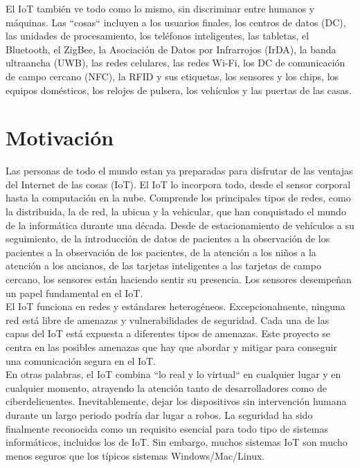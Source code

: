 {El IoT también ve todo como lo mismo, sin discriminar entre humanos y máquinas. Las ``cosas`` incluyen a los usuarios finales, los centros de datos (DC), las unidades de procesamiento, los teléfonos inteligentes, las tabletas, el Bluetooth, el ZigBee, la Asociación de Datos por Infrarrojos (IrDA), la banda ultraancha (UWB), las redes celulares, las redes Wi-Fi, los DC de comunicación de campo cercano (NFC), la RFID y sus etiquetas, los sensores y los chips, los equipos domésticos, los relojes de pulsera, los vehículos y las puertas de las casas. \cite{lea2020iot} \\

\section{Motivación} \label{motivacion}

Las personas de todo el mundo estan ya preparadas para disfrutar de las ventajas del Internet de las cosas (IoT). El IoT lo incorpora todo, desde el sensor corporal hasta la computación en la nube. Comprende los principales tipos de redes, como la distribuida, la de red, la ubicua y la vehicular, que han conquistado el mundo de la informática durante una década. Desde de estacionamiento de vehículos a su seguimiento, de la introducción de datos de pacientes a la observación de los pacientes a la observación de los pacientes, de la atención a los niños a la atención a los ancianos, de las tarjetas inteligentes a las tarjetas de campo cercano, los sensores están haciendo sentir su presencia. Los sensores desempeñan un papel fundamental en el IoT.\\

El IoT funciona en redes y estándares heterogéneos. Excepcionalmente, ninguna red está libre de amenazas y vulnerabilidades de seguridad. Cada una de las capas del IoT está expuesta a diferentes tipos de amenazas. Este proyecto se centra en las posibles amenazas que hay que abordar y mitigar para conseguir una comunicación segura en el IoT. \cite{hanes2017iot} \\

En otras palabras, el IoT combina ``lo real y lo virtual`` en cualquier lugar y en cualquier momento, atrayendo la atención tanto de desarrolladores como de ciberdelicuentes. Inevitablemente, dejar los dispositivos sin intervención humana durante un largo periodo podría dar lugar a robos. La seguridad ha sido finalmente reconocida como un requisito esencial para todo tipo de sistemas informáticos, incluidos los de IoT. Sin embargo, muchos sistemas IoT son mucho menos seguros que los típicos sistemas Windows/Mac/Linux. \\

}
